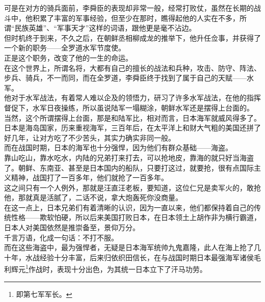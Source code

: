 \begin{multicols}{\theparacolNo}
可是在对方的骑兵面前，李舜臣的表现却非常一般，经常打败仗，虽然在长期的战斗中，他积累了丰富的军事经验，但至少在那时，瞧得起他的人实在不多，所谓“民族英雄”、“军事天才”这样的词语，跟他更是毫不沾边。\\

但时机终于到来，不久之后，在朝鲜丞相柳成龙的推举下，他升任佥事，并获得了一个新的职务——全罗道水军节度使。\\

正是这个职务，改变了他的一生的命运。\\

在这个世界上，所谓名将，大都有自己的擅长的战法和兵种，攻击、防守、阵法、步兵、骑兵，不一而同，而在全罗道，李舜臣终于找到了属于自己的天赋——水军。\\

他对于水军战法，有着常人难以企及的领悟力，研习了许多水军战法，在他的指挥督促下，水军日夜操练，所以虽说陆军一塌糊涂，朝鲜水军还是摆得上台面的。\\

当然，这个所谓摆得上台面，那是和陆军比，相对而言，日本海军就威风得多了。\\

日本是海岛国家，历来重视海军，三百年后，在太平洋上和财大气粗的美国还拼了好几年，让对方吃了不少苦头，其实力确实非同一般。\\

而在战国时期，日本的海军也十分强悍，因为他们有群众基础——海盗。\\

靠山吃山，靠水吃水，内陆的兄弟打来打去，可以抢地皮，靠海的就只好当海盗了。朝鲜、东南亚、甚至是日本国内的船队，只要打这过，就要抢，很有点国际主义精神，战国打了一百多年，他们就抢了一百多年。\\

这之间只有一个人例外，那就是汪直汪老板，要知道，这位仁兄是卖军火的，敢抢他，那就真是活腻了，二话不说，拿大炮轰死你没商量。\\

在这一点上，日本兄弟们有着清晰的认识，因为一直以来，他们都保持着自己的传统性格——欺软怕硬，所以后来美国打败日本，在日本领土上胡作非为横行霸道，日本人对美国依然是推崇备至，景仰万分。\\

千言万语，化成一句话：不打不服。\\

而在这些海盗中，最为强悍者，无疑是日本海军统帅九鬼嘉隆，此人在海上抢了几十年，水战经验十分丰富，后来归依织田信长，在与战国时期日本最强海军诸侯毛利辉元\footnote{即第七军军长。}作战时，表现十分出色，为其统一日本立下了汗马功劳。\\


\end{multicols}
